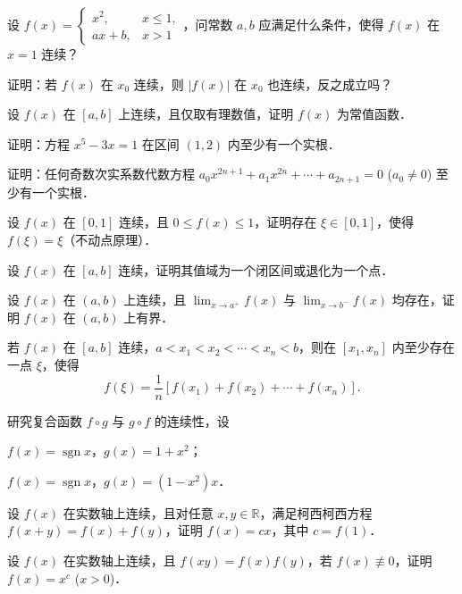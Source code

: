 \begin{xiti}
\item 设 $f(x) = \begin{cases} x^2, & x \leqslant 1, \\ ax + b, & x > 1 \end{cases}$，问常数 $a, b$ 应满足什么条件，使得 $f(x)$ 在 $x = 1$ 连续？

\item 证明：若 $f(x)$ 在 $x_0$ 连续，则 $|f(x)|$ 在 $x_0$ 也连续，反之成立吗？

\item 设 $f(x)$ 在 $[a, b]$ 上连续，且仅取有理数值，证明 $f(x)$ 为常值函数．

\item 证明：方程 $x^5 - 3x = 1$ 在区间 $(1, 2)$ 内至少有一个实根．

\item 证明：任何奇数次实系数代数方程 $a_0 x^{2n+1} + a_1 x^{2n} + \cdots + a_{2n+1} = 0$ ($a_0 \neq 0$) 至少有一个实根．

\item 设 $f(x)$ 在 $[0, 1]$ 连续，且 $0 \leqslant f(x) \leqslant 1$，证明存在 $\xi \in [0, 1]$，使得 $f(\xi) = \xi$（不动点原理）．

\item 设 $f(x)$ 在 $[a, b]$ 连续，证明其值域为一个闭区间或退化为一个点．

\item 设 $f(x)$ 在 $(a, b)$ 上连续，且 $\lim_{x \to a^+} f(x)$ 与 $\lim_{x \to b^-} f(x)$ 均存在，证明 $f(x)$ 在 $(a, b)$ 上有界．

\item 若 $f(x)$ 在 $[a, b]$ 连续，$a < x_1 < x_2 < \cdots < x_n < b$，则在 $[x_1, x_n]$ 内至少存在一点 $\xi$，使得
\[
f(\xi) = \frac{1}{n}[f(x_1) + f(x_2) + \cdots + f(x_n)].
\]

\item 研究复合函数 $f \circ g$ 与 $g \circ f$ 的连续性，设
\begin{ziti}
\item $f(x) = \operatorname{sgn} x$，$g(x) = 1 + x^2$；
\item $f(x) = \operatorname{sgn} x$，$g(x) = (1 - x^2)x$．
\end{ziti}

\item 设 $f(x)$ 在实数轴上连续，且对任意 $x, y \in \mathbb{R}$，满足柯西柯西方程 $f(x + y) = f(x) + f(y)$，证明 $f(x) = cx$，其中 $c = f(1)$．

\item 设 $f(x)$ 在实数轴上连续，且 $f(xy) = f(x)f(y)$，若 $f(x) \not\equiv 0$，证明 $f(x) = x^c$ ($x > 0$)．


\end{xiti}
